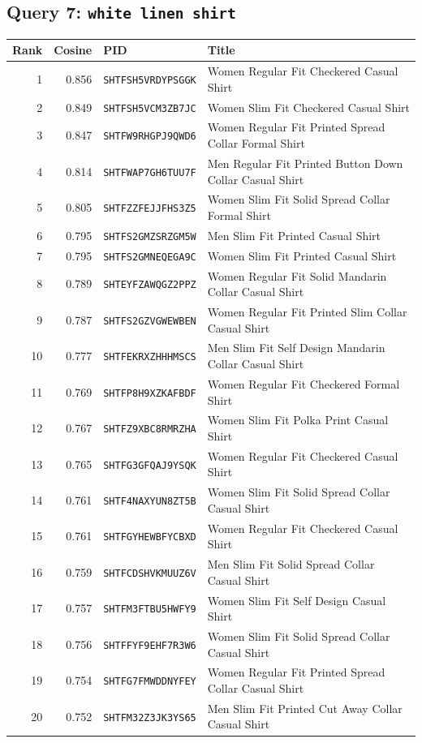 \subsection*{Query 7: \texttt{white linen shirt}}
\begin{longtable}{r r l p{}}
\toprule
Rank & Cosine & PID & Title \\
\midrule
\endhead
1 & 0.856 & \texttt{SHTFSH5VRDYPSGGK} & Women Regular Fit Checkered Casual Shirt \\
2 & 0.849 & \texttt{SHTFSH5VCM3ZB7JC} & Women Slim Fit Checkered Casual Shirt \\
3 & 0.847 & \texttt{SHTFW9RHGPJ9QWD6} & Women Regular Fit Printed Spread Collar Formal Shirt \\
4 & 0.814 & \texttt{SHTFWAP7GH6TUU7F} & Men Regular Fit Printed Button Down Collar Casual Shirt \\
5 & 0.805 & \texttt{SHTFZZFEJJFHS3Z5} & Women Slim Fit Solid Spread Collar Formal Shirt \\
6 & 0.795 & \texttt{SHTFS2GMZSRZGM5W} & Men Slim Fit Printed Casual Shirt \\
7 & 0.795 & \texttt{SHTFS2GMNEQEGA9C} & Women Slim Fit Printed Casual Shirt \\
8 & 0.789 & \texttt{SHTEYFZAWQGZ2PPZ} & Women Regular Fit Solid Mandarin Collar Casual Shirt \\
9 & 0.787 & \texttt{SHTFS2GZVGWEWBEN} & Women Regular Fit Printed Slim Collar Casual Shirt \\
10 & 0.777 & \texttt{SHTFEKRXZHHHMSCS} & Men Slim Fit Self Design Mandarin Collar Casual Shirt \\
11 & 0.769 & \texttt{SHTFP8H9XZKAFBDF} & Women Regular Fit Checkered Formal Shirt \\
12 & 0.767 & \texttt{SHTFZ9XBC8RMRZHA} & Women Slim Fit Polka Print Casual Shirt \\
13 & 0.765 & \texttt{SHTFG3GFQAJ9YSQK} & Women Regular Fit Checkered Casual Shirt \\
14 & 0.761 & \texttt{SHTF4NAXYUN8ZT5B} & Women Slim Fit Solid Spread Collar Casual Shirt \\
15 & 0.761 & \texttt{SHTFGYHEWBFYCBXD} & Women Regular Fit Checkered Casual Shirt \\
16 & 0.759 & \texttt{SHTFCDSHVKMUUZ6V} & Men Slim Fit Solid Spread Collar Casual Shirt \\
17 & 0.757 & \texttt{SHTFM3FTBU5HWFY9} & Women Slim Fit Self Design Casual Shirt \\
18 & 0.756 & \texttt{SHTFFYF9EHF7R3W6} & Women Slim Fit Solid Spread Collar Casual Shirt \\
19 & 0.754 & \texttt{SHTFG7FMWDDNYFEY} & Women Regular Fit Printed Spread Collar Casual Shirt \\
20 & 0.752 & \texttt{SHTFM32Z3JK3YS65} & Men Slim Fit Printed Cut Away Collar Casual Shirt \\
\end{longtable}